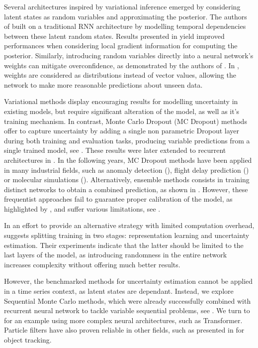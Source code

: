 \documentclass{article}
\begin{document}
Several architectures inspired by variational inference emerged by considering latent states as random variables and approximating the posterior.
The authors of \cite{Chung2015NIPS} built on a traditional RNN architecture by modelling temporal dependencies between these latent random states.
Results presented in \cite{Fortunato2017bayesian} yield improved performances when considering local gradient information for computing the posterior.
Similarly, introducing random variables directly into a neural network's weights can mitigate overconfidence, as demonstrated by the authors of \cite{Hinton1993}.
In \cite{Blundell2015}, weights are considered as distributions instead of vector values, allowing the network to make more reasonable predictions about unseen data.

Variational methods display encouraging results for modelling uncertainty in existing models, but require significant alteration of the model, as well as it's training mechanism.
In contrast, Monte Carlo Dropout (MC Dropout) methods offer to capture uncertainty by adding a single non parametric Dropout layer during both training and evaluation tasks, producing variable predictions from a single trained model, see \cite{Gal2016}.
These results were later extended to recurrent architectures in \cite{Gal2016NIPS}.
In the following years, MC Dropout methods have been applied in many industrial fields, such as anomaly detection (\cite{Zhu2017DeepAC}), flight delay prediction (\cite{Vandal2018}) or molecular simulations (\cite{Wen2020UncertaintyQI}).
Alternatively, ensemble methods consists in training distinct networks to obtain a combined prediction, as shown in \cite{Pearce2018}.
However, these frequentist approaches fail to guarantee proper calibration of the model, as highlighted by \cite{ashukha2020pitfalls}, and suffer various limitations, see \cite{Fong2020}.

In an effort to provide an alternative strategy with limited computation overhead, \cite{Brosse2020OnLA} suggests splitting training in two stages: representation learning and uncertainty estimation.
Their experiments indicate that the latter should be limited to the last layers of the model, as introducing randomness in the entire network increases complexity without offering much better results.

However, the benchmarked methods for uncertainty estimation cannot be applied in a time series context, as latent states are dependant.
Instead, we explore Sequential Monte Carlo methods, which were already successfully combined with recurrent neural network to tackle variable sequential problems, see \cite{Ma2020}.
We turn to \cite{Martin2020TheMC} for an example using more complex neural architectures, such as Transformer.
Particle filters have also proven reliable in other fields, such as presented in \cite{Liu2020LSTMPF} for object tracking.
\end{document}
